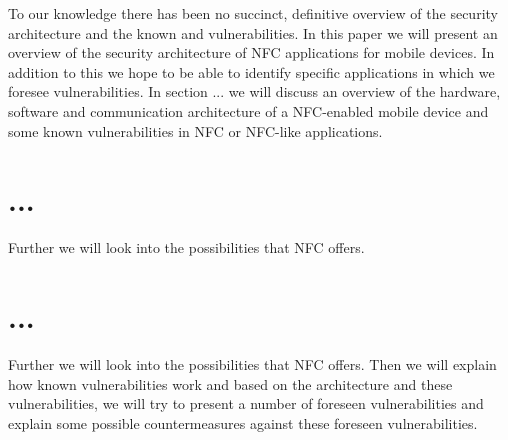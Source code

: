 To our knowledge there has been no succinct, definitive overview of the security architecture and the known and vulnerabilities. In this paper we will present an overview of the security architecture of NFC applications for mobile devices.
In addition to this we hope to be able to identify specific applications in which we foresee vulnerabilities.
In section ... we will discuss an overview of the hardware, software and communication architecture of a NFC-enabled mobile device and some known vulnerabilities in NFC or NFC-like applications.
 
\section{...}
Further we will look into the possibilities that NFC offers.
 
\section{...}
Further we will look into the possibilities that NFC offers.
Then we will explain how known vulnerabilities work and based on the architecture and these vulnerabilities, we will try to present a number of foreseen vulnerabilities and explain some possible countermeasures against these foreseen vulnerabilities.


